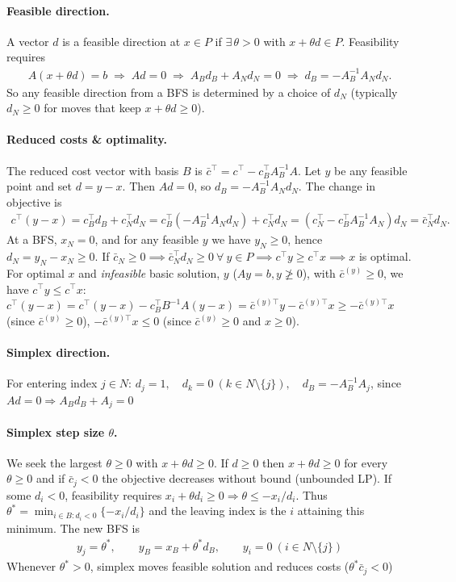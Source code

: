 \documentclass{article}
\begin{document}
\paragraph{Feasible direction.} 
A vector $d$ is a feasible direction at $x\in P$ if $\exists\,\theta>0$ with $x+\theta d\in P$.
Feasibility requires
\begin{align*}
    A(x+\theta d)=b 
    \;\Longrightarrow\;
    A d = 0
    \;\Longrightarrow\;
    A_B d_B + A_N d_N = 0
    \;\Longrightarrow\;
    d_B = -A_B^{-1}A_N d_N.
\end{align*}
So any feasible direction from a BFS is determined by a choice of $d_N$ (typically $d_N\ge0$ for moves that keep $x+\theta d\ge0$).


\paragraph{Reduced costs \& optimality.}
The reduced cost vector with basis $B$ is $\bar c^\top = c^\top - c_B^\top A_B^{-1}A$.
Let $y$ be any feasible point and set $d = y - x$.
Then $A d = 0$, so $d_B = -A_B^{-1}A_N d_N$.
The change in objective is
\begin{align*}
    c^\top(y-x) = c_B^\top d_B + c_N^\top d_N 
    = c_B^\top(-A_B^{-1}A_N d_N) + c_N^\top d_N 
    = (c_N^\top - c_B^\top A_B^{-1}A_N)d_N 
    = \bar c_N^\top d_N.
\end{align*}
At a BFS, $x_N = 0$, and for any feasible $y$ we have $y_N\ge0$, hence $d_N = y_N - x_N \ge 0$.
If $\bar c_N \ge 0 \implies \bar c_N^\top d_N \ge 0\ \forall\ y\in P \implies c^\top y \ge c^\top x \implies x$ is optimal.
For optimal $x$ and \emph{infeasible} basic solution, $y$ ($Ay=b, y \not\geq 0$), with $\bar c^{(y)}\geq0$, we have $c^\top y\leq c^\top x$: $c^\top(y - x) = c^\top(y - x) - c_B^\top B^{-1}A(y-x) = \bar c^{(y)\top} y - \bar c^{(y)\top} x \geq - \bar c^{(y)\top} x$ (since $\bar c^{(y)}\geq 0$), $- \bar c^{(y)\top} x  \leq 0$ (since $\bar c^{(y)}\geq 0$ and $x\geq 0$).

\paragraph{Simplex direction.} For entering index $j\in N$: 
$d_j = 1,\quad d_k = 0\ (k\in N\setminus\{j\}),\quad d_B = -A_B^{-1}A_j$, since $Ad = 0 \Rightarrow A_B d_B + A_j = 0$

\paragraph{Simplex step size $\theta$.} We seek the largest $\theta\ge0$ with $x+\theta d\ge0$.
If $d \ge 0$ then $x+\theta d\ge0$ for every $\theta\ge0$ and if $\bar c_j<0$ the objective decreases without bound (unbounded LP).
If some $d_i<0$, feasibility requires $x_i + \theta d_i \ge 0 \Rightarrow \theta \le -x_i/d_i$.
Thus $\theta^* = \min_{i\in B: d_i<0} \{-x_i/d_i\}$ and the leaving index is the $i$ attaining this minimum. The new BFS is
\begin{align*}
y_j = \theta^*,\qquad
y_B = x_B + \theta^* d_B,\qquad
y_i = 0\ (i\in N\setminus\{j\})
\end{align*}
Whenever $\theta^* > 0$, simplex moves feasible solution and reduces costs ($\theta^* \bar c_j < 0$)
\end{document}
